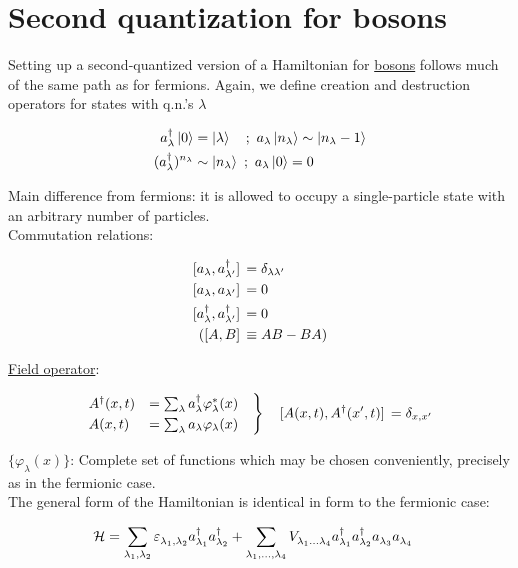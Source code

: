 \section{Second quantization for bosons}

Setting up a second-quantized version of a Hamiltonian for \underline{bosons} follows much of the same path as for fermions. Again, we define creation and destruction operators for states with q.n.'s $\lambda$

\begin{align}
	a_\lambda^\dagger \ket{0} &= \ket{\lambda} \quad ; \ a_\lambda\ket{n_\lambda} \sim \ket{n_\lambda - 1} \\
	(a_\lambda^\dagger)^{n_\lambda} &\sim \ket{n_\lambda} \ ; \ a_\lambda\ket{0} = 0
\end{align}

Main difference from fermions: it is allowed to occupy a single-particle state with an arbitrary number of particles. \\  Commutation relations:

\begin{align}
	\comm*{a_\lambda}{a_{\lambda'}^\dagger} &= \delta_{\lambda \lambda'} \\
	\comm*\Big{a_\lambda}{a_{\lambda'}} &= 0 \\
	\comm*{a_\lambda^\dagger}{a_{\lambda'}^\dagger} &= 0 \\ 
	(\comm*{A}{B} &\equiv AB - BA)
\end{align}

\uline{Field operator}:

\begin{align}
	\begin{rcases}
		A^\dagger (x, t) &= \sum_\lambda a_\lambda^\dagger \varphi_\lambda^*(x) \quad \\
		A(x, t) &= \sum_\lambda a_\lambda \varphi_\lambda(x)
	\end{rcases}
	\quad
	\comm*{A(x,t)}{A^\dagger (x', t)} = \delta_{x, x'}
\end{align}

$\{\varphi_\lambda(x)\}$: Complete set of functions which may be chosen conveniently, precisely as in the fermionic case. \\

The general form of the Hamiltonian is identical in form to the fermionic case:

\begin{tcolorbox}
	\begin{align}
		\mathcal{H} &= \sum_{\lambda_1, \lambda_2} \varepsilon_{\lambda_1, \lambda_2}^{} a_{\lambda_1}^\dagger a_{\lambda_2}^\dagger
		+ \sum_{\lambda_1, ..., \lambda_4}V_{\lambda_1 ... \lambda_4}^{}a_{\lambda_1}^\dagger a_{\lambda_2}^\dagger a_{\lambda_3}^{} a_{\lambda_4}^{}
	\end{align}
\end{tcolorbox}

